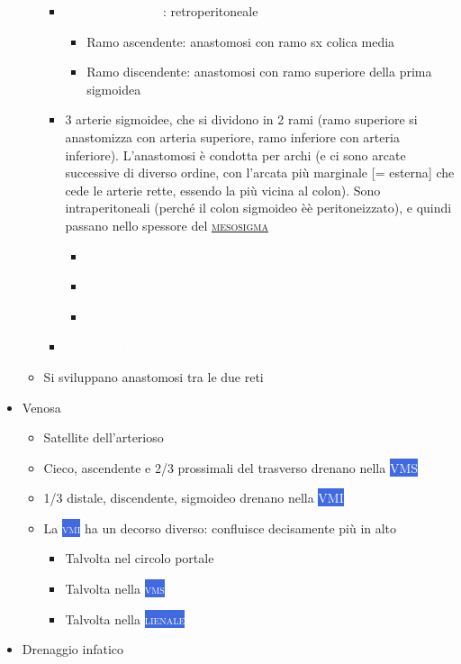 \documentclass[italian,]{article}
\providecommand{\tightlist}{%
  \setlength{\itemsep}{0pt}\setlength{\parskip}{0pt}}
\newcommand{\ven}[1]{\colorbox{RoyalBlue}{\textcolor{white}{\textsc{#1}}}}
\newcommand{\art}[1]{\colorbox{RedOrange}{\textcolor{white}{\textsc{#1}}}}
\renewcommand{\a}[1]{\underline{\textsc{#1}}}
\begin{document}
\begin{itemize}
\begin{itemize}
    \begin{itemize}
    \item
      \art{arteria colica sx}: retroperitoneale

      \begin{itemize}
      \tightlist
      \item
        Ramo ascendente: anastomosi con ramo sx colica media
      \item
        Ramo discendente: anastomosi con ramo superiore della prima
        sigmoidea
      \end{itemize}
    \item
      3 arterie sigmoidee, che si dividono in 2 rami (ramo superiore si
      anastomizza con arteria superiore, ramo inferiore con arteria
      inferiore). L'anastomosi è condotta per archi (e ci sono arcate
      successive di diverso ordine, con l'arcata più marginale {[}=
      esterna{]} che cede le arterie rette, essendo la più vicina al
      colon). Sono intraperitoneali (perché il colon sigmoideo èè
      peritoneizzato), e quindi passano nello spessore del \a{mesosigma}

      \begin{itemize}
      \item
        \art{sigmoidea superiore}
      \item
        \art{sigmoidea media}
      \item
        \art{sigmoidea inferiore}
      \end{itemize}
    \item
      \art{arteria rettale superiore}
    \end{itemize}
  \item
    Si sviluppano anastomosi tra le due reti
  \end{itemize}
\item
  Venosa

  \begin{itemize}
  \tightlist
  \item
    Satellite dell'arterioso
  \item
    Cieco, ascendente e 2/3 prossimali del trasverso drenano nella
    \ven{VMS}
  \item
    1/3 distale, discendente, sigmoideo drenano nella \ven{VMI}
  \item
    La \ven{vmi} ha un decorso diverso: confluisce decisamente più in
    alto

    \begin{itemize}
    \tightlist
    \item
      Talvolta nel circolo portale
    \item
      Talvolta nella \ven{vms}
    \item
      Talvolta nella \ven{lienale}
    \end{itemize}
  \end{itemize}
\item
  Drenaggio infatico


\end{itemize}
\end{document}
